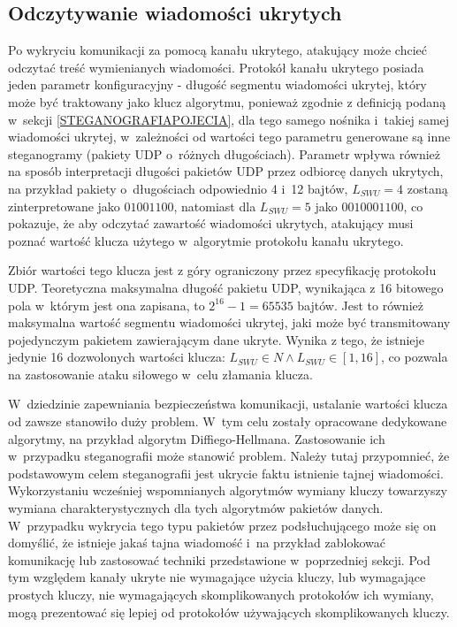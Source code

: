 \documentclass[a4paper, twoside, 12pt]{report}
\begin{document}
       \subsection{Odczytywanie wiadomości ukrytych}
       Po wykryciu komunikacji za pomocą kanału ukrytego, atakujący może chcieć
       odczytać treść wymienianych wiadomości. Protokół kanału ukrytego posiada
       jeden parametr konfiguracyjny - długość segmentu wiadomości ukrytej, który
       może być traktowany jako klucz algorytmu, ponieważ zgodnie z definicją podaną
       w~sekcji \ref{STEGANOGRAFIAPOJECIA}, dla tego samego nośnika i~takiej samej
       wiadomości ukrytej, w~zależności od wartości tego parametru generowane są
       inne steganogramy (pakiety UDP o~różnych długościach). Parametr wpływa również
       na sposób interpretacji długości pakietów UDP przez odbiorcę danych ukrytych,
       na przykład pakiety o~długościach odpowiednio 4 i~12 bajtów, \( L_{SWU} = 4 \)
       zostaną zinterpretowane jako \( 0100 1100 \), natomiast dla \( L_{SWU} = 5 \)
       jako \( 00100 01100 \), co pokazuje, że aby odczytać zawartość wiadomości
       ukrytych, atakujący musi poznać wartość klucza użytego w~algorytmie protokołu
       kanału ukrytego.

       Zbiór wartości tego
       klucza jest z góry ograniczony przez specyfikację protokołu UDP. Teoretyczna
       maksymalna długość pakietu UDP, wynikająca z 16 bitowego pola w~którym jest
       ona zapisana, to \(2^{16} - 1 = 65535\) bajtów. Jest to również maksymalna
       wartość segmentu wiadomości ukrytej, jaki może być transmitowany pojedynczym
       pakietem zawierającym dane ukryte. Wynika z tego, że istnieje jedynie 16
       dozwolonych wartości klucza: \( L_{SWU} \in N \land L_{SWU} \in [1, 16] \),
       co pozwala na zastosowanie ataku siłowego w~celu złamania klucza.

       W~dziedzinie zapewniania bezpieczeństwa komunikacji, ustalanie wartości
       klucza od zawsze stanowiło duży problem. W~tym celu zostały opracowane
       dedykowane algorytmy, na przykład algorytm Diffiego-Hellmana. Zastosowanie
       ich w~przypadku steganografii może stanowić problem. Należy tutaj przypomnieć,
       że podstawowym celem steganografii jest ukrycie faktu istnienie tajnej wiadomości.
       Wykorzystaniu wcześniej wspomnianych algorytmów wymiany kluczy towarzyszy
       wymiana charakterystycznych dla tych algorytmów pakietów danych. W~przypadku
       wykrycia tego typu pakietów przez podsłuchującego może się on domyślić,
       że istnieje jakaś tajna wiadomość i~na przykład zablokować komunikację lub
       zastosować techniki przedstawione w~poprzedniej sekcji. Pod tym względem
       kanały ukryte nie wymagające użycia kluczy, lub wymagające prostych kluczy,
       nie wymagających skomplikowanych protokołów ich wymiany, mogą prezentować
       się lepiej od protokołów używających skomplikowanych kluczy.
\end{document}
